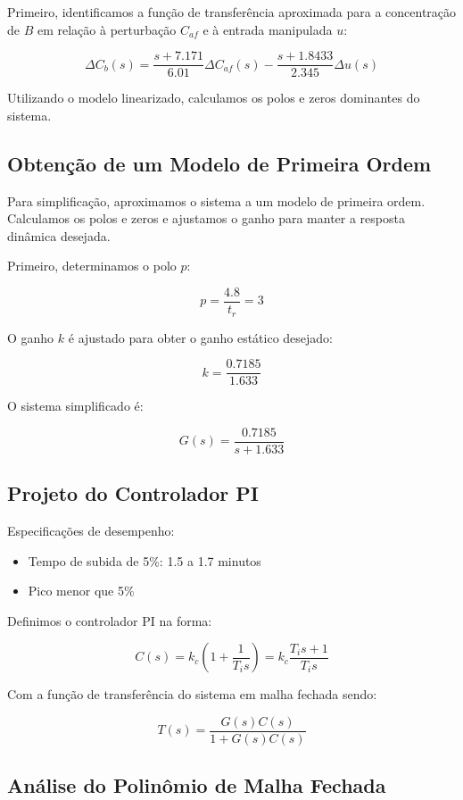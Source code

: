 \documentclass[a4paper,12pt]{report}
\begin{document}
Primeiro, identificamos a função de transferência aproximada para a concentração de \( B \) em relação à perturbação \( C_{af} \) e à entrada manipulada \( u \):

\[
\Delta C_b(s) = \frac{s+7.171}{6.01} \Delta C_{af}(s) - \frac{s+1.8433}{2.345} \Delta u(s)
\]

Utilizando o modelo linearizado, calculamos os polos e zeros dominantes do sistema.

\subsection*{Obtenção de um Modelo de Primeira Ordem}

Para simplificação, aproximamos o sistema a um modelo de primeira ordem. Calculamos os polos e zeros e ajustamos o ganho para manter a resposta dinâmica desejada.

Primeiro, determinamos o polo \( p \):

\[
p = \frac{4.8}{t_r} = 3
\]

O ganho \( k \) é ajustado para obter o ganho estático desejado:

\[
k = \frac{0.7185}{1.633}
\]

O sistema simplificado é:

\[
G(s) = \frac{0.7185}{s + 1.633}
\]

\subsection*{Projeto do Controlador PI}

Especificações de desempenho:
\begin{itemize}
    \item Tempo de subida de 5\%: 1.5 a 1.7 minutos
    \item Pico menor que 5\%
\end{itemize}

Definimos o controlador PI na forma:

\[
C(s) = k_c \left( 1 + \frac{1}{T_i s} \right) = k_c \frac{T_i s + 1}{T_i s}
\]

Com a função de transferência do sistema em malha fechada sendo:

\[
T(s) = \frac{G(s)C(s)}{1 + G(s)C(s)}
\]

\subsection*{Análise do Polinômio de Malha Fechada}
\end{document}
